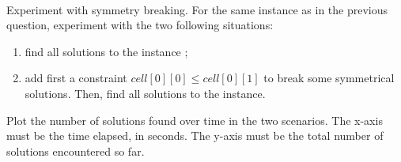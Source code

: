 \documentclass[12pt]{report}
\newcommand{\answerbox}[2]{\hfill\break\\
	\framebox[\linewidth]{\parbox[c][#1][c]{\dimexpr\linewidth-2\fboxsep-2\fboxrule}{#2}}
}
\begin{document}
\begin{Exercise}[title={Modeling the Magic Square Problem}]
		\answerbox{2cm}{
		}

		\Question Experiment with symmetry breaking. For the same instance as in the previous question, experiment with the two following situations:
		\begin{enumerate}
			\item find all solutions to the instance ;
			\item add first a constraint $cell[0][0] \leq cell[0][1]$ to break some symmetrical solutions. Then, find all solutions to the instance.
		\end{enumerate}
		Plot the number of solutions found over time in the two scenarios. The x-axis must be the time elapsed, in seconds. The y-axis must be the total number of solutions encountered so far.

		\answerbox{10cm}{
		}

	\end{Exercise}
\end{document}
